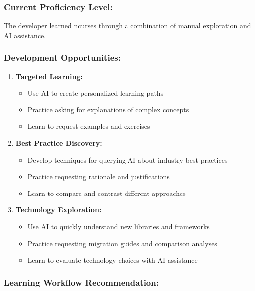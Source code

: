 \documentclass[12pt,a4paper]{article}
\begin{document}
\subsubsection*{Current Proficiency Level:}
The developer learned ncurses through a combination of manual exploration and AI assistance.

\subsubsection*{Development Opportunities:}

\begin{enumerate}
    \item \textbf{Targeted Learning:}
    \begin{itemize}
        \item Use AI to create personalized learning paths
        \item Practice asking for explanations of complex concepts
        \item Learn to request examples and exercises
    \end{itemize}
    
    \item \textbf{Best Practice Discovery:}
    \begin{itemize}
        \item Develop techniques for querying AI about industry best practices
        \item Practice requesting rationale and justifications
        \item Learn to compare and contrast different approaches
    \end{itemize}
    
    \item \textbf{Technology Exploration:}
    \begin{itemize}
        \item Use AI to quickly understand new libraries and frameworks
        \item Practice requesting migration guides and comparison analyses
        \item Learn to evaluate technology choices with AI assistance
    \end{itemize}
\end{enumerate}

\subsubsection*{Learning Workflow Recommendation:}
\end{document}
